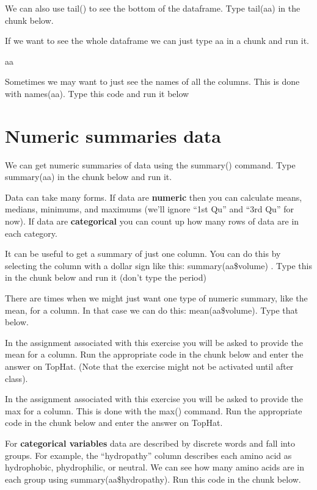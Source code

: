 \documentclass[
]{book}
\newenvironment{Shaded}{\begin{snugshade}}{\end{snugshade}}
\newcommand{\NormalTok}[1]{#1}
\begin{document}
We can also use tail() to see the bottom of the dataframe. Type tail(aa) in the chunk below.

If we want to see the whole dataframe we can just type aa in a chunk and run it.

\begin{Shaded}
\begin{Highlighting}[]
\NormalTok{aa}
\end{Highlighting}
\end{Shaded}

Sometimes we may want to just see the names of all the columns. This is done with names(aa). Type this code and run it below

\hypertarget{numeric-summaries-data}{%
\section{Numeric summaries data}\label{numeric-summaries-data}}

We can get numeric summaries of data using the summary() command. Type summary(aa) in the chunk below and run it.

Data can take many forms. If data are \textbf{numeric} then you can calculate means, medians, minimums, and maximums (we'll ignore ``1st Qu'' and ``3rd Qu'' for now). If data are \textbf{categorical} you can count up how many rows of data are in each category.

It can be useful to get a summary of just one column. You can do this by selecting the column with a dollar sign like this: summary(aa\$volume) . Type this in the chunk below and run it (don't type the period)

There are times when we might just want one type of numeric summary, like the mean, for a column. In that case we can do this: mean(aa\$volume). Type that below.

In the assignment associated with this exercise you will be asked to provide the mean for a column. Run the appropriate code in the chunk below and enter the answer on TopHat. (Note that the exercise might not be activated until after class).

In the assignment associated with this exercise you will be asked to provide the max for a column. This is done with the max() command. Run the appropriate code in the chunk below and enter the answer on TopHat.

For \textbf{categorical variables} data are described by discrete words and fall into groups. For example, the ``hydropathy'' column describes each amino acid as hydrophobic, phydrophilic, or neutral. We can see how many amino acids are in each group using summary(aa\$hydropathy). Run this code in the chunk below.
\end{document}

